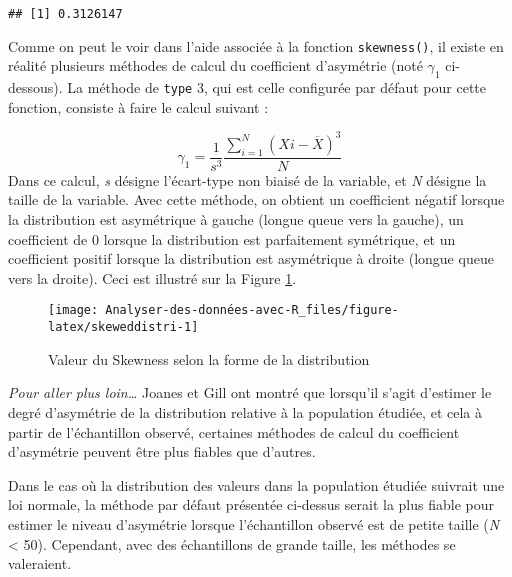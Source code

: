 \documentclass[
  french,
]{book}
\newenvironment{Shaded}{\begin{snugshade}}{\end{snugshade}}
\newcommand{\DataTypeTok}[1]{\textcolor[rgb]{0.13,0.29,0.53}{#1}}
\newcommand{\DecValTok}[1]{\textcolor[rgb]{0.00,0.00,0.81}{#1}}
\newcommand{\KeywordTok}[1]{\textcolor[rgb]{0.13,0.29,0.53}{\textbf{#1}}}
\newcommand{\NormalTok}[1]{#1}
\newcommand{\OperatorTok}[1]{\textcolor[rgb]{0.81,0.36,0.00}{\textbf{#1}}}
\begin{document}
\begin{Shaded}
\end{Shaded}

\begin{verbatim}
## [1] 0.3126147
\end{verbatim}

Comme on peut le voir dans l'aide associée à la fonction \texttt{skewness()}, il existe en réalité plusieurs méthodes de calcul du coefficient d'asymétrie (noté \(\gamma_{1}\) ci-dessous). La méthode de \texttt{type} 3, qui est celle configurée par défaut pour cette fonction, consiste à faire le calcul suivant :

\[\gamma_{1} =  \frac{1}{s^3} {\frac{\sum_{i=1}^{N} (X{i} - \overline{X})^3}{N}}\]
Dans ce calcul, \emph{s} désigne l'écart-type non biaisé de la variable, et \emph{N} désigne la taille de la variable. Avec cette méthode, on obtient un coefficient négatif lorsque la distribution est asymétrique à gauche (longue queue vers la gauche), un coefficient de 0 lorsque la distribution est parfaitement symétrique, et un coefficient positif lorsque la distribution est asymétrique à droite (longue queue vers la droite). Ceci est illustré sur la Figure \ref{fig:skeweddistri}.

\begin{figure}

{\centering \texttt{[image: Analyser-des-données-avec-R\_files/figure-latex/skeweddistri-1]} 

}

\caption{Valeur du Skewness selon la forme de la distribution}\label{fig:skeweddistri}
\end{figure}

\emph{Pour aller plus loin\ldots{}}
Joanes et Gill \autocite*{joanesComparingMeasuresSample1998} ont montré que lorsqu'il s'agit d'estimer le degré d'asymétrie de la distribution relative à la population étudiée, et cela à partir de l'échantillon observé, certaines méthodes de calcul du coefficient d'asymétrie peuvent être plus fiables que d'autres.

Dans le cas où la distribution des valeurs dans la population étudiée suivrait une loi normale, la méthode par défaut présentée ci-dessus serait la plus fiable pour estimer le niveau d'asymétrie lorsque l'échantillon observé est de petite taille (\emph{N} \textless{} 50). Cependant, avec des échantillons de grande taille, les méthodes se valeraient.
\end{document}

